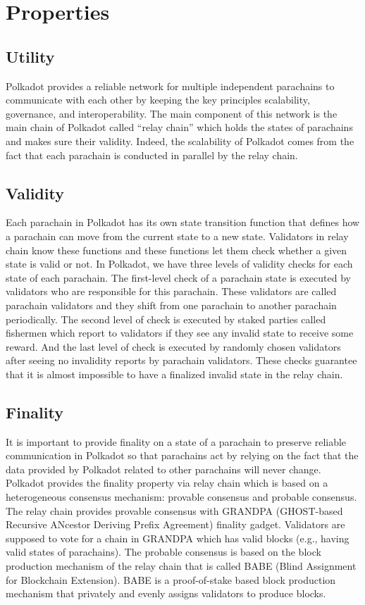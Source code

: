 \section{Properties}

 \subsection{Utility}

 Polkadot provides a reliable network for multiple independent parachains to communicate with each other by keeping the key principles scalability, governance, and interoperability.  The main component of this network is the main chain of Polkadot called ``relay chain'' which holds the states of parachains and makes sure their validity. Indeed, the scalability of Polkadot comes from the fact that each parachain is conducted in parallel by the relay chain.

 \subsection{Validity}
Each parachain in Polkadot has its own state transition function that defines how a parachain can move from the current state to a new state.   Validators in relay chain  know these functions and these functions let them  check whether a given state is valid or not.  In Polkadot, we have three levels of validity checks for each state of each parachain. The first-level check of a parachain state is executed by validators who are responsible for this parachain. These validators are called parachain validators and they shift from one parachain to another parachain periodically. The second level of check is executed by staked parties called fishermen which report to validators if they see any invalid state to receive some reward. And the last level of check is executed by randomly chosen validators after seeing no invalidity reports by parachain validators. These checks guarantee that it is almost impossible to have a finalized invalid state in the relay chain.

 \subsection{Finality}


 It is important to provide finality on a state of a parachain to preserve reliable communication in Polkadot so that parachains act by relying on the fact that the data provided by Polkadot related to other parachains will never change.  Polkadot provides the finality property via relay chain which is based on a heterogeneous consensus mechanism: provable consensus and probable consensus. The relay chain provides provable consensus with GRANDPA (GHOST-based Recursive ANcestor Deriving Prefix Agreement)  finality gadget. Validators are supposed to vote for a chain in GRANDPA  which has valid blocks (e.g., having valid states of parachains). The probable consensus is based on the block production mechanism of the relay chain that is called BABE (Blind Assignment for Blockchain Extension). BABE is a proof-of-stake based block production mechanism that privately and evenly assigns validators to produce blocks.


